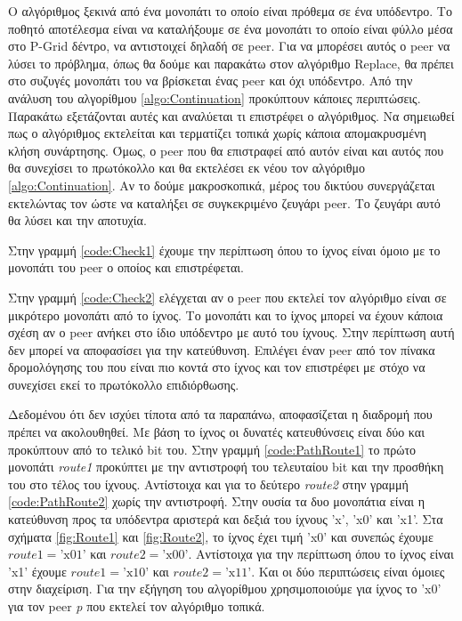 Ο αλγόριθμος ξεκινά από ένα μονοπάτι το οποίο είναι πρόθεμα σε ένα υπόδεντρο. 
Το ποθητό αποτέλεσμα είναι να καταλήξουμε σε ένα μονοπάτι το οποίο είναι 
φύλλο μέσα στο P-Grid δέντρο, να αντιστοιχεί δηλαδή σε peer. Για να μπορέσει 
αυτός ο peer να λύσει το πρόβλημα, όπως θα δούμε και παρακάτω στον αλγόριθμο 
Replace, θα πρέπει στο συζυγές μονοπάτι του να βρίσκεται ένας peer και όχι 
υπόδεντρο. Από την ανάλυση του αλγορίθμου \ref{algo:Continuation} προκύπτουν 
κάποιες περιπτώσεις. Παρακάτω εξετάζονται αυτές και αναλύεται τι επιστρέφει ο 
αλγόριθμος. Να σημειωθεί πως ο αλγόριθμος εκτελείται και τερματίζει τοπικά 
χωρίς κάποια απομακρυσμένη κλήση συνάρτησης. 
Όμως, ο peer που θα επιστραφεί από αυτόν είναι και αυτός που θα συνεχίσει το 
πρωτόκολλο και θα εκτελέσει εκ νέου τον αλγόριθμο \ref{algo:Continuation}. 
Αν το δούμε μακροσκοπικά, μέρος του δικτύου συνεργάζεται εκτελώντας τον 
ώστε να καταλήξει σε συγκεκριμένο ζευγάρι peer. Το ζευγάρι αυτό θα λύσει και 
την αποτυχία.

Στην γραμμή \ref{code:Check1} έχουμε την περίπτωση όπου το ίχνος είναι 
όμοιο με το μονοπάτι του peer ο οποίος και επιστρέφεται. 

Στην γραμμή \ref{code:Check2} ελέγχεται αν ο peer που εκτελεί τον αλγόριθμο 
είναι σε μικρότερο μονοπάτι από το ίχνος. Το μονοπάτι και το ίχνος μπορεί να 
έχουν κάποια σχέση αν ο peer ανήκει στο ίδιο υπόδεντρο με αυτό του ίχνους. 
Στην περίπτωση αυτή δεν μπορεί να αποφασίσει για την κατεύθυνση. Επιλέγει 
έναν peer από τον πίνακα δρομολόγησης του που είναι πιο κοντά στο ίχνος και 
τον επιστρέφει με στόχο να συνεχίσει εκεί το πρωτόκολλο επιδιόρθωσης.

Δεδομένου ότι δεν ισχύει τίποτα από τα παραπάνω, αποφασίζεται η διαδρομή 
που πρέπει να ακολουθηθεί. Με βάση το ίχνος οι δυνατές κατευθύνσεις είναι 
δύο και προκύπτουν από το τελικό bit του. Στην γραμμή \ref{code:PathRoute1} 
το πρώτο μονοπάτι \textit{route1} προκύπτει με την αντιστροφή του 
τελευταίου bit και την προσθήκη του στο τέλος του ίχνους. Αντίστοιχα και 
για το δεύτερο \textit{route2} στην γραμμή \ref{code:PathRoute2} χωρίς την 
αντιστροφή. Στην ουσία τα δυο μονοπάτια είναι η κατεύθυνση προς τα υπόδεντρα 
αριστερά και δεξιά του ίχνους 'x', 'x0' και 'x1'. Στα σχήματα 
\ref{fig:Route1} και \ref{fig:Route2}, το ίχνος έχει τιμή 'x0' και συνεπώς 
έχουμε $route1 = \textrm{'x01'}$ και $route2 = \textrm{'x00'}$. 
Αντίστοιχα για την περίπτωση όπου το ίχνος είναι 'x1' έχουμε 
$route1 = \textrm{'x10'}$ και $route2 = \textrm{'x11'}$. 
Και οι δύο περιπτώσεις είναι όμοιες στην διαχείριση. 
Για την εξήγηση του αλγορίθμου χρησιμοποιούμε για ίχνος το 'x0' για τον peer 
\textit{p} που εκτελεί τον αλγόριθμο τοπικά.

